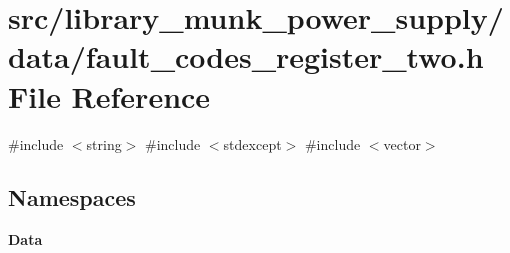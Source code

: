 \section{src/library\+\_\+munk\+\_\+power\+\_\+supply/data/fault\+\_\+codes\+\_\+register\+\_\+two.h File Reference}
\label{fault__codes__register__two_8h}
{\ttfamily \#include $<$string$>$}\newline
{\ttfamily \#include $<$stdexcept$>$}\newline
{\ttfamily \#include $<$vector$>$}\newline
\subsection*{Namespaces}
\begin{DoxyCompactItemize}
\item 
 \textbf{ Data}
\end{DoxyCompactItemize}
